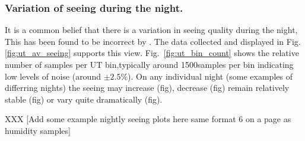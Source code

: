 {{%


\subsubsection{Variation of seeing during the night.}
It is a common belief that there is a variation in seeing quality during the night, This has been found to be incorrect by \citet{munoz97nighttime}. The data collected and displayed in Fig.\ref{fig:ut_av_seeing} supports this view. Fig.~\ref{fig:ut_bin_count} shows the relative number of samples per UT bin,typically around 1500samples per bin indicating low levels of noise (around $\pm 2.5$\%). On any individual night (some examples of differring nights) the seeing may increase (fig), decrease (fig) remain relatively stable (fig) or vary quite dramatically (fig).

XXX [Add some example nightly seeing plots here same format 6 on a page as humidity samples]

}}

